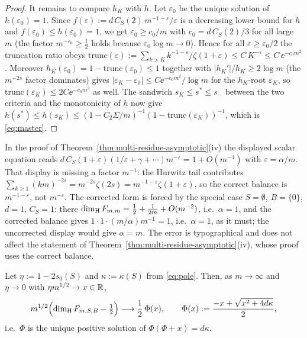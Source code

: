 \begin{proof}
It remains to compare $h_K$ with $h$.  Let $\varepsilon_0$ be the unique
solution of $h(\varepsilon_0)=1$.  Since
$f(\varepsilon):=d\,C_S(2)\,m^{-1-\varepsilon}/\varepsilon$ is a decreasing
lower bound for $h$ and $f(\varepsilon_0)\le h(\varepsilon_0)=1$, we get
$\varepsilon_0\ge c_0/m$ with $c_0=d\,C_S(2)/3$ for all large $m$ (the factor
$m^{-\varepsilon_0}\ge\tfrac12$ holds because $\varepsilon_0\log m\to0$).
Hence for all $\varepsilon\ge\varepsilon_0/2$ the truncation ratio obeys
$\mathrm{trunc}(\varepsilon):=\sum_{k>K}k^{-1-\varepsilon}/\zeta(1+\varepsilon)
\le C\,K^{-\varepsilon}\le C\,\ee^{-c_0m^2}$.  Moreover $h_K(\varepsilon_0)
=1-\mathrm{trunc}(\varepsilon_0)\le1$ together with $|h_K'|/h_K\ge2\log m$ (the
$m^{-2s}$ factor dominates) gives $|\varepsilon_K-\varepsilon_0|\le
C\ee^{-c_0m^2}/\log m$ for the $h_K$-root $\varepsilon_K$, so
$\mathrm{trunc}(\varepsilon_K)\le2C\ee^{-c_0m^2}$ as well.  The sandwich
$s_K\le s^*\le s_-$ between the two criteria and the monotonicity of $h$ now
give $h(s^*)\le h(s_K)\le(1-C_2\Sigma/m)^{-1}(1-\mathrm{trunc}(\varepsilon_K))^{-1}$,
which is \eqref{eq:master}.
\end{proof}

\begin{remark}\label{rem:typo}
In the proof of Theorem~\ref{thm:multi-residue-asymptotic}(iv) the displayed
scalar equation reads $d\,C_S(1+\varepsilon)(1/\varepsilon+\gamma+\cdots)m^{-\varepsilon}=1+O(m^{-1})$
with $\varepsilon=\alpha/m$. That display is missing a factor $m^{-1}$: the
Hurwitz tail contributes $\sum_{k\ge1}(km)^{-2s}=m^{-2s}\zeta(2s)
=m^{-1-\varepsilon}\zeta(1+\varepsilon)$, so the correct balance is
$m^{-1-\varepsilon}$, not $m^{-\varepsilon}$. The corrected form is forced by
the special case $S=\emptyset$, $B=\{0\}$, $d=1$, $C_S=1$: there
$\dim_{\mathrm{H}} F_{m,m}=\frac12+\frac1{2m}+O(m^{-2})$, i.e.\ $\alpha=1$, and
the corrected balance gives $1\cdot1\cdot(m/\alpha)m^{-1}=1$, i.e.\ $\alpha=1$,
as it must; the uncorrected display would give $\alpha=m$. The error is
typographical and does not affect the statement of
Theorem~\ref{thm:multi-residue-asymptotic}(iv), whose proof uses the correct
balance.
\end{remark}

\begin{theorem}\label{thm:critical-scaling}
Let $\eta:=1-2s_0(S)$ and
$\kappa:=\kappa(S)$ from \eqref{eq:pole}. Then, as $m\to\infty$ and
$\eta\to0$ with $\eta m^{1/2}\to x\in\mathbb{R}$,
\begin{equation}\label{eq:scaling-limit}
m^{1/2}\Bigl(\dim_{\mathrm{H}} F_{m,S,B}-\tfrac12\Bigr)\longrightarrow
\frac12\,\Phi(x),
\qquad
\Phi(x):=\frac{-x+\sqrt{x^2+4d\kappa}}{2},
\end{equation}
i.e.\ $\Phi$ is the unique positive solution of $\Phi(\Phi+x)=d\kappa$.
\end{theorem}


